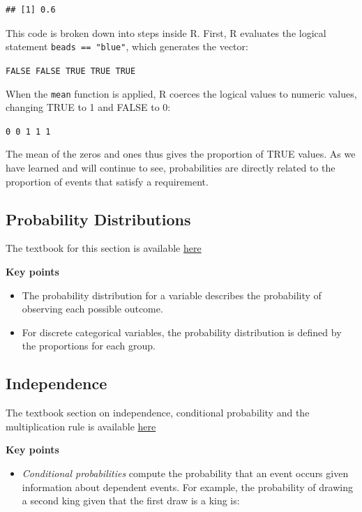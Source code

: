 \documentclass[
]{article}
\providecommand{\tightlist}{%
  \setlength{\itemsep}{0pt}\setlength{\parskip}{0pt}}
\begin{document}
\begin{verbatim}
## [1] 0.6
\end{verbatim}

This code is broken down into steps inside R. First, R evaluates the
logical statement \texttt{beads\ ==\ "blue"}, which generates the
vector:

\texttt{FALSE\ FALSE\ TRUE\ TRUE\ TRUE}

When the \texttt{mean} function is applied, R coerces the logical values
to numeric values, changing TRUE to 1 and FALSE to 0:

\texttt{0\ 0\ 1\ 1\ 1}

The mean of the zeros and ones thus gives the proportion of TRUE values.
As we have learned and will continue to see, probabilities are directly
related to the proportion of events that satisfy a requirement.

\hypertarget{probability-distributions}{%
\subsection{Probability Distributions}\label{probability-distributions}}

The textbook for this section is available
\href{https://rafalab.github.io/dsbook/probability.html\#discrete-probability-distributions}{here}

\textbf{Key points}

\begin{itemize}
\tightlist
\item
  The probability distribution for a variable describes the probability
  of observing each possible outcome.
\item
  For discrete categorical variables, the probability distribution is
  defined by the proportions for each group.
\end{itemize}

\hypertarget{independence}{%
\subsection{Independence}\label{independence}}

The textbook section on independence, conditional probability and the
multiplication rule is available
\href{https://rafalab.github.io/dsbook/probability.html\#independence}{here}

\textbf{Key points}

\begin{itemize}
\tightlist
\item
  \emph{Conditional probabilities} compute the probability that an event
  occurs given information about dependent events. For example, the
  probability of drawing a second king given that the first draw is a
  king is:
\end{itemize}
\end{document}
